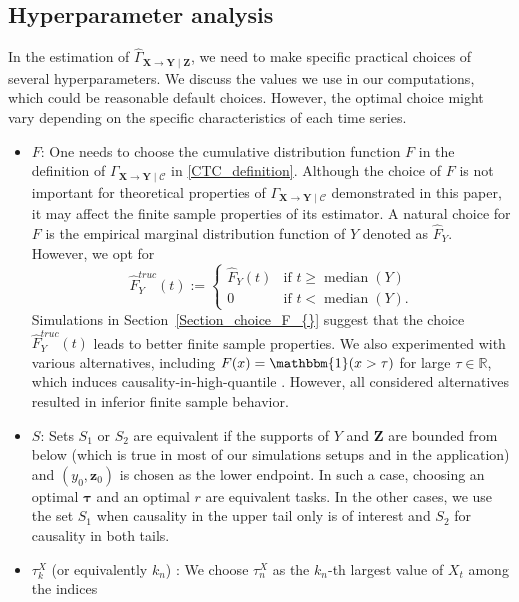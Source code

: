 \documentclass[a4paper,11pt]{article}
\begin{document}
\subsection{Hyperparameter analysis}
\label{Section_choice_of_hyperparameters}

In the estimation of  $\hat{\Gamma}_{\textbf{X}\to\textbf{Y}\mid\mathcal{\textbf{Z}}}$, we need to make specific practical choices of several hyperparameters. We discuss the values we use in our computations, which could be reasonable default choices. However, the optimal choice might vary depending on the specific characteristics of each time series. 

\begin{itemize}
    \item  $F$: One needs to choose the cumulative distribution function $F$ in the definition of ${\Gamma}_{\textbf{X}\to\textbf{Y}\mid\mathcal{C}}$ in \eqref{CTC_definition}. Although the choice of $F$ is not important for theoretical properties of ${\Gamma}_{\textbf{X}\to\textbf{Y}\mid\mathcal{C}}$ demonstrated in this paper, it may affect the finite sample properties of its estimator. A natural choice for $F$ is the empirical marginal distribution function of $Y$ denoted as $\hat{F}_Y$. However, we opt for     \[  \hat{F}_Y^{truc}(t):= \begin{cases} \hat{F}_Y(t) & \text{if } t \geq \operatorname{median}(Y) \\ 0 & \text{if } t < \operatorname{median}(Y). \end{cases} \]
Simulations in Section~\ref{Section_choice_F_{}} suggest that the choice $ \hat{F}_Y^{truc}(t)$ leads to better finite sample properties. We also experimented with various alternatives, including $F(x) = \mathbbm{1}(x > \tau)$ for large  $\tau\in\mathbb{R}$, which induces causality-in-high-quantile \citep{Candelon2013}. However, all considered alternatives resulted in inferior finite sample behavior. 
    \item $S$: Sets $S_1$ or $S_2$ are equivalent if the supports of  $Y$ and  $\textbf{Z}$ are bounded from below (which is true in most of our simulations setups and in the application) and $(y_0, \textbf{z}_0)$ is chosen as the lower endpoint. In such a case, choosing an optimal $\boldsymbol{\tau}$ and an optimal $r$ are equivalent tasks. In the other cases, we use the set $S_1$ when causality in the upper tail only is of interest and $S_2$ for causality in both tails.  
    \item  $\tau^X_k$ (or equivalently $k_n$) : We choose \(\tau_n^X\) as the \(k_n\)-th largest value of \(X_t\) among the indices

\end{itemize}
\end{document}

